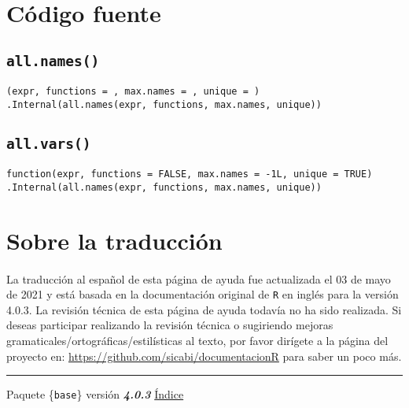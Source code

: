 \documentclass{article}[letter, 12pt]
\newlength\tindent
\renewcommand{\indent}{\hspace*{\tindent}}
\def\code#1{\texttt{#1}}
\def\codename#1{\texttt{\color{gray}\small#1}}
\begin{document}
\section{\color{gray}Código fuente}
\subsection{\color{gray} \code{all.names()}}
\indent\code{\color{red}{function}(expr, functions = \color{blue}{TRUE}, max.names = \color{blue}{-1L}, unique = \color{blue}{FALSE})} \\
\indent\indent\code{.Internal(all.names(expr, functions, max.names, unique))}\\
\subsection{\color{gray} \code{all.vars()}}
\indent\code{function(expr, functions = FALSE, max.names = -1L, unique = TRUE)} \\
\indent\indent\code{.Internal(all.names(expr, functions, max.names, unique))}\\

\section{\color{gray}Sobre la traducción}
\paragraph{}
La traducción al español de esta página de ayuda fue actualizada el 03 de mayo de 2021 y está basada en la documentación original de \codename{R} en inglés para la versión 4.0.3. La revisión técnica de esta página de ayuda todavía no ha sido realizada. Si deseas participar realizando la revisión técnica o sugiriendo mejoras gramaticales/ortográficas/estilísticas al texto, por favor dirígete a la página del proyecto en: \href{https://github.com/sicabi/documentacionR}{https://github.com/sicabi/documentacionR} para saber un poco más.
\\
\par\noindent\rule{\textwidth}{0.4pt}
\centerline{Paquete \{\code{base}\} versión \textbf{\emph{4.0.3}} \href{run:/Vocabulary.pdf}{Índice}}
\end{document}
